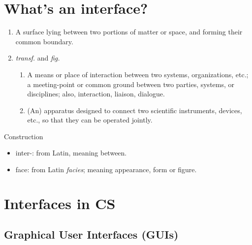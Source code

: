 \mode*

\section{What's an interface?}

\begin{frame}
  \begin{definition}
    \begin{enumerate}
      \item A surface lying between two portions of matter or space, and 
        forming their common boundary.
      \item \emph{transf.} and \emph{fig.}
        \begin{enumerate}
          \item A means or place of interaction between two systems, 
            organizations, etc.; a meeting-point or common ground between two 
            parties, systems, or disciplines; also, interaction, liaison, 
            dialogue.
          \item (An) apparatus designed to connect two scientific instruments, 
            devices, etc., so that they can be operated jointly.
        \end{enumerate}
    \end{enumerate}
  \end{definition}
\end{frame}

\begin{frame}
  \begin{block}{Construction}
    \begin{itemize}
      \item inter-: from Latin, meaning between.
      \item face: from Latin \emph{facies}; meaning appearance, form or figure.
    \end{itemize}
  \end{block}
\end{frame}

\section{Interfaces in CS}

\subsection{Graphical User Interfaces (GUIs)}

